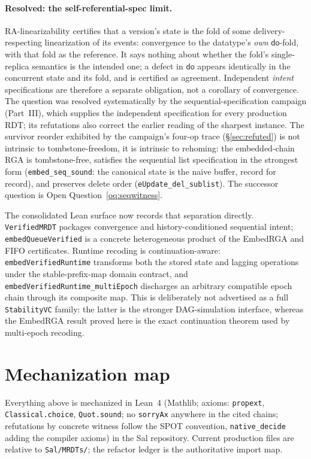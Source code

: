 \documentclass[11pt]{article}
\newcommand{\lean}[1]{\texttt{#1}}
\newcommand{\dodo}{\mathsf{do}}
\begin{document}
\paragraph{Resolved: the self-referential-spec limit.}
RA-linearizability certifies that a version's state is the fold of some
delivery-respecting linearization of its events: convergence to the
datatype's \emph{own} $\dodo$-fold, with that fold as the reference. It
says nothing about whether the fold's single-replica semantics is the
intended one; a defect in $\dodo$ appears identically in the concurrent
state and its fold, and is certified as agreement. Independent
\emph{intent} specifications are therefore a separate obligation, not a
corollary of convergence. The question was resolved systematically by
the sequential-specification campaign (Part~III), which supplies the
independent specification for every production RDT; its refutations
also correct the earlier reading of the sharpest instance. The survivor
reorder exhibited by the campaign's four-op trace
(\S\ref{sec:refuted}) is not intrinsic to tombstone-freedom, it is
intrinsic to rehoming: the embedded-chain RGA is tombstone-free,
satisfies the sequential list specification in the strongest form
(\lean{embed\_seq\_sound}: the canonical state is the naive buffer,
record for record), and preserves delete order
(\lean{eUpdate\_del\_sublist}). The successor question is Open
Question~\ref{oq:seqwitness}.

The consolidated Lean surface now records that separation directly.
\lean{VerifiedMRDT} packages convergence and history-conditioned sequential
intent; \lean{embedQueueVerified} is a concrete heterogeneous product of the
EmbedRGA and FIFO certificates.  Runtime recoding is continuation-aware:
\lean{embedVerifiedRuntime} transforms both the stored state and lagging
operations under the stable-prefix-map domain contract, and
\lean{embedVerifiedRuntime\_multiEpoch} discharges an arbitrary compatible
epoch chain through its composite map.  This is deliberately not advertised
as a full \lean{StabilityVC} family: the latter is the stronger DAG-simulation
interface, whereas the EmbedRGA result proved here is the exact continuation
theorem used by multi-epoch recoding.

\section{Mechanization map}
\label{sec:mech}

Everything above is mechanized in Lean~4 (Mathlib; axioms:
\lean{propext}, \lean{Classical.choice}, \lean{Quot.sound}; no
\lean{sorryAx} anywhere in the cited chains; refutations by concrete
witness follow the SPOT convention, \lean{native\_decide} adding the
compiler axioms) in the Sal repository. Current production files are relative
to \lean{Sal/MRDTs/}; the refactor ledger is the authoritative import map.
\end{document}
